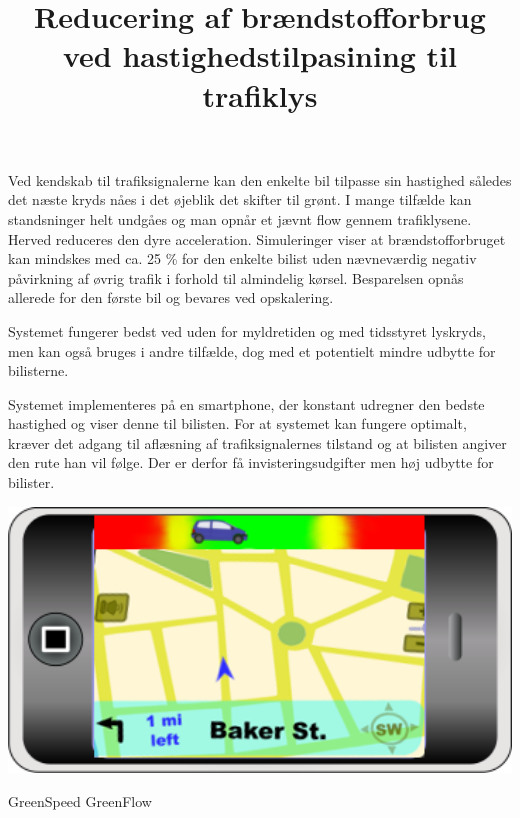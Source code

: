 \documentclass{article}
\title{Reducering af brændstofforbrug ved hastighedstilpasining til trafiklys}
\date{}
\begin{document}
\maketitle

Ved kendskab til trafiksignalerne kan den enkelte bil tilpasse sin hastighed således det næste kryds nåes i det øjeblik det skifter til grønt.
I mange tilfælde kan standsninger helt undgåes og man opnår et jævnt flow gennem trafiklysene.
Herved reduceres den dyre acceleration.
Simuleringer viser at brændstofforbruget kan mindskes med ca. 25 \% for den enkelte bilist uden nævneværdig negativ påvirkning af øvrig trafik i forhold til almindelig kørsel.
Besparelsen opnås allerede for den første bil og bevares ved opskalering.

Systemet fungerer bedst ved uden for myldretiden og med tidsstyret lyskryds, men kan også bruges i andre tilfælde, dog med et potentielt mindre udbytte for bilisterne.

Systemet implementeres på en smartphone, der konstant udregner den bedste hastighed og viser denne til bilisten. 
For at systemet kan fungere optimalt, kræver det adgang til aflæsning af trafiksignalernes tilstand og at bilisten angiver den rute han vil følge.
Der er derfor få invisteringsudgifter men høj udbytte for bilister.

\includegraphics[width=1\textwidth]{images/product.png}


GreenSpeed
GreenFlow
\end{document}
